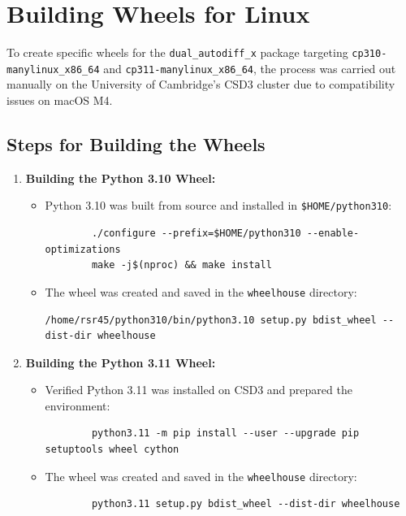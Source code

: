 \documentclass[a4paper,12pt]{article}
\begin{document}
\section{Building Wheels for Linux}

To create specific wheels for the \texttt{dual\_autodiff\_x} package targeting \texttt{cp310-manylinux\_x86\_64} and \texttt{cp311-manylinux\_x86\_64}, the process was carried out manually on the University of Cambridge's CSD3 cluster due to compatibility issues on macOS M4.

\subsection{Steps for Building the Wheels}
\begin{enumerate}
    \item \textbf{Building the Python 3.10 Wheel:}
    \begin{itemize}
        \item Python 3.10 was built from source and installed in \texttt{\$HOME/python310}:
        \begin{verbatim}
        ./configure --prefix=$HOME/python310 --enable-optimizations
        make -j$(nproc) && make install
        \end{verbatim}
        \item The wheel was created and saved in the \texttt{wheelhouse} directory:
        \begin{verbatim}
/home/rsr45/python310/bin/python3.10 setup.py bdist_wheel --dist-dir wheelhouse
        \end{verbatim}
    \end{itemize}

    \item \textbf{Building the Python 3.11 Wheel:}
    \begin{itemize}
        \item Verified Python 3.11 was installed on CSD3 and prepared the environment:
        \begin{verbatim}
        python3.11 -m pip install --user --upgrade pip setuptools wheel cython
        \end{verbatim}
        \item The wheel was created and saved in the \texttt{wheelhouse} directory:
        \begin{verbatim}
        python3.11 setup.py bdist_wheel --dist-dir wheelhouse
        \end{verbatim}
    \end{itemize}
\end{enumerate}
\end{document}
